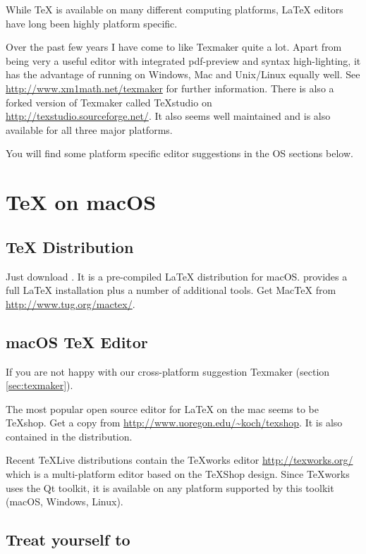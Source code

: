 While \TeX{} is available on many different computing platforms, \LaTeX{}
editors have long been highly platform specific.

Over the past few years I have come to like Texmaker quite a lot.
Apart from being very a useful editor with integrated pdf-preview and syntax
high-lighting, it has the advantage of running on Windows, Mac and
Unix/Linux equally well.  See \url{http://www.xm1math.net/texmaker} for
further information.  There is also a forked version of Texmaker called
TeXstudio on \url{http://texstudio.sourceforge.net/}.  It also seems well
maintained and is also available for all three major platforms.

You will find some platform specific editor suggestions in the OS sections
below.

\section{\TeX{} on macOS}

\subsection{\TeX{} Distribution}

Just download . It is a
pre-compiled \LaTeX{} distribution for macOS.  provides a full \LaTeX{}
installation plus a number of additional tools. Get Mac\TeX{} from
\url{http://www.tug.org/mactex/}.

\subsection{macOS \TeX{} Editor}

If you are not happy with our cross-platform suggestion Texmaker (section \ref{sec:texmaker}).

The most popular open source editor for \LaTeX{} on the mac seems to be
\TeX{}shop.  Get a copy from \url{http://www.uoregon.edu/~koch/texshop}. It
is also contained in the  distribution.

Recent \TeX Live distributions contain the \TeX{}works editor
\url{http://texworks.org/} which is a multi-platform editor based on the \TeX{}Shop
design. Since \TeX{}works uses the Qt toolkit, it is available on any platform
supported by this toolkit (macOS, Windows, Linux).

\subsection{Treat yourself to }

